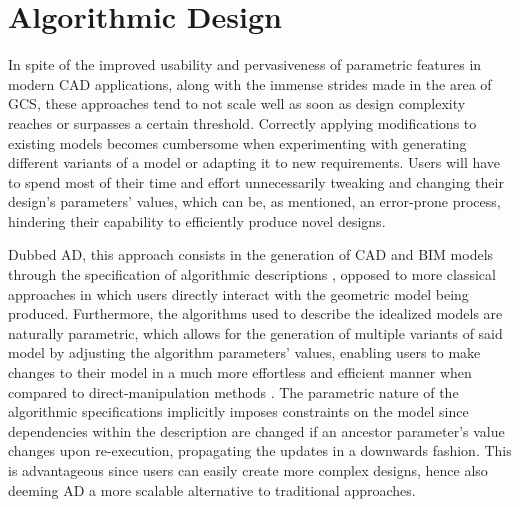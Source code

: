 \section{Algorithmic Design}
\label{sec:intro.ad}

In spite of the improved usability and pervasiveness of parametric features in
modern \ac{CAD} applications, along with the immense strides made in the area of
\ac{GCS}, these approaches tend to not scale well as soon as design complexity
reaches or surpasses a certain threshold.  Correctly applying modifications to
existing models becomes cumbersome when experimenting with generating different
variants of a model or adapting it to new requirements.  Users will have to
spend most of their time and effort unnecessarily tweaking and changing their
design's parameters' values, which can be, as mentioned, an error-prone process,
hindering their capability to efficiently produce novel designs.

Dubbed \ac{AD}, this approach consists in the generation of \ac{CAD} and
\ac{BIM} models through the specification of algorithmic descriptions
\cite{McCormack:2004:GDPDR}, opposed to more classical approaches in which users
directly interact with the geometric model being produced.  Furthermore, the
algorithms used to describe the idealized models are naturally parametric, which
allows for the generation of multiple variants of said model by adjusting the
algorithm parameters' values, enabling users to make changes to their model in a
much more effortless and efficient manner when compared to direct-manipulation
methods \cite{Leitao:2014:PESLGD}.  The parametric nature of the algorithmic
specifications implicitly imposes constraints on the model since dependencies
within the description are changed if an ancestor parameter's value changes upon
re-execution, propagating the updates in a downwards fashion.  This is
advantageous since users can easily create more complex designs, hence also
deeming \ac{AD} a more scalable alternative to traditional approaches.

